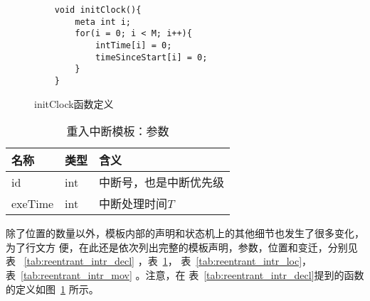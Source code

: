 
\begin{figure}[H]
	\centering
	\begin{lstlisting}
	void initClock(){
		meta int i;
		for(i = 0; i < M; i++){
			intTime[i] = 0;
			timeSinceStart[i] = 0;
		}
	}
	\end{lstlisting}
	\caption{initClock函数定义}
	\label{fig:initClock}
\end{figure}

\begin{table}[htb]
	\centering
	\caption{重入中断模板：参数}
	\label{tab:reentrant_intr_para}
	\begin{tabularx}{\linewidth}{p{7em}p{5em}X}
		\toprule[1.5pt]
		{\heiti 名称} & {\heiti 类型} & {\heiti 含义}\\
		\midrule[1pt]
		id & int & 中断号，也是中断优先级 \\
		\midrule[0.5pt]
		exeTime & int & 中断处理时间$T$ \\
		\bottomrule[1.5pt]
	\end{tabularx}
\end{table}

除了位置的数量以外，模板内部的声明和状态机上的其他细节也发生了很多变化，为了行文方
便，在此还是依次列出完整的模板声明，参数，位置和变迁，分别见表
~\ref{tab:reentrant_intr_decl} ，表~\ref{tab:reentrant_intr_para}，
表~\ref{tab:reentrant_intr_loc}，表~\ref{tab:reentrant_intr_mov} 。注意，在
表~\ref{tab:reentrant_intr_decl}提到的函数的定义如图~\ref{fig:initClock} 所示。

